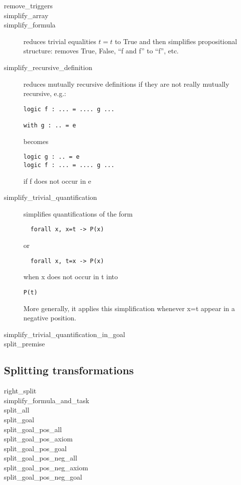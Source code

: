 \begin{description}
\item[remove\_triggers]
\item[simplify\_array]
\item[simplify\_formula] reduces trivial equalities $t=t$ to True and
  then simplifies propositional structure: removes True, False, ``f
  and f'' to ``f'', etc.
\item[simplify\_recursive\_definition]
  reduces mutually recursive definitions if they are not really mutually recursive, e.g.:
\begin{verbatim}
logic f : ... = .... g ...

with g : .. = e
\end{verbatim}
becomes
\begin{verbatim}
logic g : .. = e
logic f : ... = .... g ...
\end{verbatim}
if f does not occur in e

\item[simplify\_trivial\_quantification]
  simplifies quantifications of the form
\begin{verbatim}
  forall x, x=t -> P(x)
\end{verbatim}
or
\begin{verbatim}
  forall x, t=x -> P(x)
\end{verbatim}
  when x does not occur in t
  into 
\begin{verbatim}
P(t)
\end{verbatim}
  More generally, it applies this simplification whenever x=t appear
  in a negative position.
  
\item[simplify\_trivial\_quantification\_in\_goal]
\item[split\_premise]
\end{description}

\subsection{Splitting transformations}

\begin{description}
\item[right\_split]
\item[simplify\_formula\_and\_task]
\item[split\_all]
\item[split\_goal]
\item[split\_goal\_pos\_all]
\item[split\_goal\_pos\_axiom]
\item[split\_goal\_pos\_goal]
\item[split\_goal\_pos\_neg\_all]
\item[split\_goal\_pos\_neg\_axiom]
\item[split\_goal\_pos\_neg\_goal]
\end{description}



